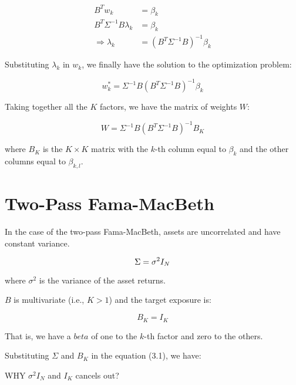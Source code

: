 \begin{equation}
    \begin{aligned}
        B^T w_k &= \beta_k \\
        B^T \Sigma^{-1} B \lambda_k &= \beta_k \\
        \Rightarrow \lambda_k &= (B^T \Sigma^{-1} B)^{-1} \beta_k
    \end{aligned}
\end{equation}

Substituting $\lambda_k$ in $w_k$, we finally have 
the solution to the optimization problem:

\begin{equation}
    w_k^* = \Sigma^{-1} B (B^T \Sigma^{-1} B)^{-1} \beta_k
\end{equation}

Taking together all the $K$ factors, we have the matrix of weights $W$:

\begin{equation}
    W = \Sigma^{-1} B (B^T \Sigma^{-1} B)^{-1} B_K
\end{equation}

where $B_K$ is the $K \times K$ matrix with the $k$-th column equal to $\beta_k$ and the other columns equal to $\beta_{k,l}$.


\section{Two-Pass Fama-MacBeth}

In the case of the two-pass Fama-MacBeth,
assets are uncorrelated and have constant variance.

\begin{equation}
        \Sigma = \sigma^2 I_N \\
\end{equation}

where $\sigma^2$ is the variance of the asset returns.

$B$ is multivariate (i.e., $K > 1$) and the 
target exposure is:

\begin{equation}
    B_K = I_K 
\end{equation}

That is, we have a $beta$ of one to the $k$-th factor and 
zero to the others.

Substituting $\Sigma$ and $B_K$ in the equation (3.1), we have:


WHY $\sigma^2 I_N$ and $I_K$ cancels out?

